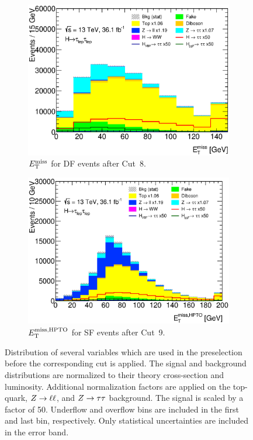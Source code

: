 \begin{figure}[htb]
\begin{subfigure}[t]{0.45\textwidth}
        \includegraphics[width=\textwidth]{./plots/event_selection/presel/emme-CutJet0Pt-MET-lin.eps}
        \caption{$E_\text{T}^\text{miss}$ for DF events after Cut~8.}\label{fig:event_selection:cutflow:metdf}
    \end{subfigure}
    \begin{subfigure}[t]{0.45\textwidth}
        \includegraphics[width=\textwidth]{./plots/event_selection/presel/eemm-CutMET-METhpto-lin.eps}
        \caption{$E_\text{T}^\text{miss,HPTO}$ for SF events after Cut~9.}\label{fig:event_selection:cutflow:hpto}
    \end{subfigure}
    \caption{Distribution of several variables which are used in the preselection before the corresponding cut is applied.
             The signal and background distributions are normalized to their theory cross-section and luminosity.
             Additional normalization factors are applied on the top-quark, $Z \to \ell \ell$, and $Z \to \tau \tau$ background.
             The signal is scaled by a factor of 50.
             Underflow and overflow bins are included in the first and last bin, respectively.
             Only statistical uncertainties are included in the error band.}\label{fig:event_selection:cutflow:1}
\end{figure}

